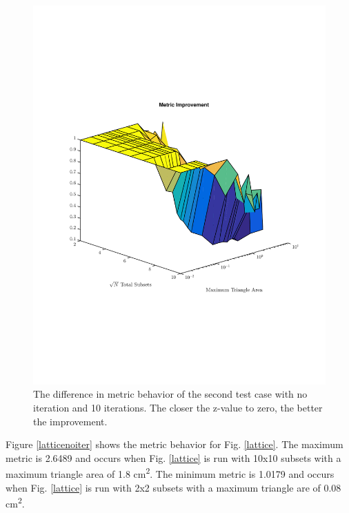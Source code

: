 \documentclass{anstrans}
\begin{document}
\begin{figure}
\centering
\includegraphics[scale=0.5, trim = 2cm 5cm 0cm 5cm,clip]{figures/SameDiff.pdf}
\caption{The difference in metric behavior of the second test case with no iteration and 10 iterations. The closer the z-value to zero, the better the improvement.}
\label{samediff}
\end{figure}

Figure \ref{latticenoiter} shows the metric behavior for Fig. \ref{lattice}. The maximum metric is 2.6489 and occurs when Fig. \ref{lattice} is run with 10x10 subsets with a maximum triangle area of 1.8 cm\textsuperscript{2}. The minimum metric is 1.0179 and occurs when Fig. \ref{lattice} is run with 2x2 subsets with a maximum triangle are of 0.08 cm\textsuperscript{2}.
\end{document}
